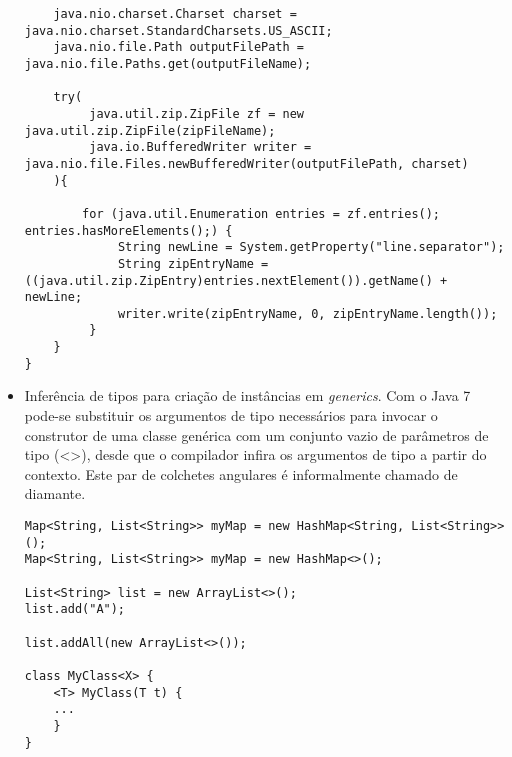 \begin{itemize}
\begin{lstlisting}
	java.nio.charset.Charset charset = java.nio.charset.StandardCharsets.US_ASCII;
	java.nio.file.Path outputFilePath = java.nio.file.Paths.get(outputFileName);
	
	try(
		 java.util.zip.ZipFile zf = new java.util.zip.ZipFile(zipFileName);
		 java.io.BufferedWriter writer = java.nio.file.Files.newBufferedWriter(outputFilePath, charset)
	){
	
		for (java.util.Enumeration entries = zf.entries(); entries.hasMoreElements();) {
			 String newLine = System.getProperty("line.separator");
			 String zipEntryName = ((java.util.zip.ZipEntry)entries.nextElement()).getName() + newLine;
			 writer.write(zipEntryName, 0, zipEntryName.length());
		 }
	}
}

\end{lstlisting}
		  
		  \clearpage
		  \item Inferência de tipos para criação de instâncias em {\it generics}\cite{OracleGenerics}\cite{Bracha:1998:MFS:286942.286957}\cite{Parnin:2011:JGA:1985441.1985446}. Com o Java 7 pode-se substituir os argumentos de tipo necessários para invocar o construtor de uma classe genérica com um conjunto vazio de parâmetros de tipo (<>), desde que o compilador infira os argumentos de tipo a partir do contexto. Este par de colchetes angulares é informalmente chamado de diamante.
  
  

\begin{lstlisting}
Map<String, List<String>> myMap = new HashMap<String, List<String>>();
Map<String, List<String>> myMap = new HashMap<>();
	
List<String> list = new ArrayList<>();
list.add("A");

list.addAll(new ArrayList<>());
	
class MyClass<X> {
	<T> MyClass(T t) {
	...
	}
}
\end{lstlisting}
	 
	  \end{itemize}
	  
	  
